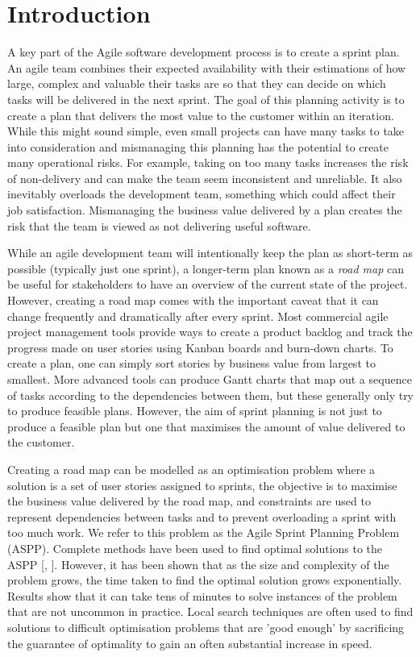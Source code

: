 
\chapter{Introduction} %

\label{ChapterIntroduction}

A key part of the Agile software development process is to create a sprint plan. An agile team combines their expected availability with their estimations of how large, complex and valuable their tasks are so that they can decide on which tasks will be delivered in the next sprint. The goal of this planning activity is to create a plan that delivers the most value to the customer within an iteration. While this might sound simple, even small projects can have many tasks to take into consideration and mismanaging this planning has the potential to create many operational risks. For example, taking on too many tasks increases the risk of non-delivery and can make the team seem inconsistent and unreliable. It also inevitably overloads the development team, something which could affect their job satisfaction. Mismanaging the business value delivered by a plan creates the risk that the team is viewed as not delivering useful software.

While an agile development team will intentionally keep the plan as short-term as possible (typically just one sprint), a longer-term plan known as a \emph{road map} can be useful for stakeholders to have an overview of the current state of the project. However, creating a road map comes with the important caveat that it can change frequently and dramatically after every sprint. Most commercial agile project management tools provide ways to create a product backlog and track the progress made on user stories using Kanban boards and burn-down charts. To create a plan, one can simply sort stories by business value from largest to smallest. More advanced tools can produce Gantt charts that map out a sequence of tasks according to the dependencies between them, but these generally only try to produce feasible plans. However, the aim of sprint planning is not just to produce a feasible plan but one that maximises the amount of value delivered to the customer.

Creating a road map can be modelled as an optimisation problem where a solution is a set of user stories assigned to sprints, the objective is to maximise the business value delivered by the road map, and constraints are used to represent dependencies between tasks and to prevent overloading a sprint with too much work. We refer to this problem as the Agile Sprint Planning Problem (ASPP). Complete methods have been used to find optimal solutions to the ASPP [\citet{golfarelli2012sprint}, \citet{golfarelli2013multi}]. However, it has been shown that as the size and complexity of the problem grows, the time taken to find the optimal solution grows exponentially. Results show that it can take tens of minutes to solve instances of the problem that are not uncommon in practice. Local search techniques are often used to find solutions to difficult optimisation problems that are 'good enough' by sacrificing the guarantee of optimality to gain an often substantial increase in speed.

